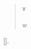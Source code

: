 \documentclass{article}
\newcommand\hits{}
\begin{document}
\begin{quote}
\begin{verbatim}
v
\end{verbatim}
\begin{verbatim*}
w
\end{verbatim*}
\end{quote}
[\hits].
\end{document}
